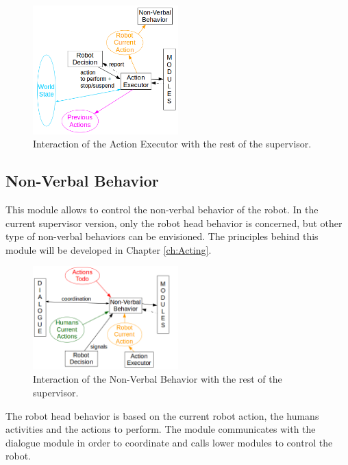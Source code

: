 \documentclass[english,a4paper,11pt,twoside]{StyleThese}
\begin{document}
\begin{figure}[!h]
	\centering
    \includegraphics[width=0.5\textwidth]{figs/Chapter2/ActionExecutor.png}
    \caption{Interaction of the Action Executor with the rest of the supervisor.}
    \label{fig:actionExecutor}
\end{figure}

\subsection{Non-Verbal Behavior}

This module allows to control the non-verbal behavior of the robot. In the current supervisor version, only the robot head behavior is concerned, but other type of non-verbal behaviors can be envisioned. The principles behind this module will be developed in Chapter \ref{ch:Acting}.

\begin{figure}[!h]
	\centering
    \includegraphics[width=0.5\textwidth]{figs/Chapter2/NVBehavior.png}
    \caption{Interaction of the Non-Verbal Behavior with the rest of the supervisor.}
    \label{fig:NVBehavior}
\end{figure}

The robot head behavior is based on the current robot action, the humans activities and the actions to perform. The module communicates with the dialogue module in order to coordinate and calls lower modules to control the robot. 
\end{document}
